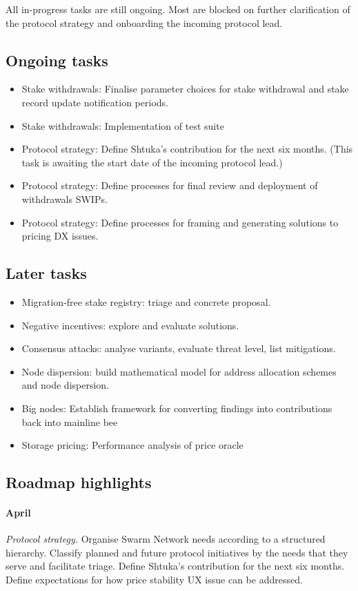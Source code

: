 All in-progress tasks are still ongoing. Most are blocked on further clarification of the protocol strategy and onboarding the incoming protocol lead.

\subsection*{Ongoing tasks}

\begin{itemize}
  \item Stake withdrawals: Finalise parameter choices for stake withdrawal and stake record update notification periods.
  \item Stake withdrawals: Implementation of test suite
  \item Protocol strategy: Define Shtuka's contribution for the next six months. (This task is awaiting the start date of the incoming protocol lead.)
  \item Protocol strategy: Define processes for final review and deployment of withdrawals SWIPs.
  \item Protocol strategy: Define processes for framing and generating solutions to pricing DX issues.
\end{itemize}

\subsection*{Later tasks}
\begin{itemize}
  \item Migration-free stake registry: triage and concrete proposal.
  \item Negative incentives: explore and evaluate solutions.
  \item Consensus attacks: analyse variants, evaluate threat level, list mitigations.
  \item Node dispersion: build mathematical model for address allocation schemes and node dispersion.
  \item Big nodes: Establish framework for converting findings into contributions back into mainline bee
  \item Storage pricing: Performance analysis of price oracle
\end{itemize}


\subsection*{Roadmap highlights}

\paragraph{April}
%
\emph{Protocol strategy.} 
%
Organise Swarm Network needs according to a structured hierarchy.
%
Classify planned and future protocol initiatives by the needs that they serve and facilitate triage.
%
Define Shtuka's contribution for the next six months.
%
Define expectations for how price stability UX issue can be addressed.

